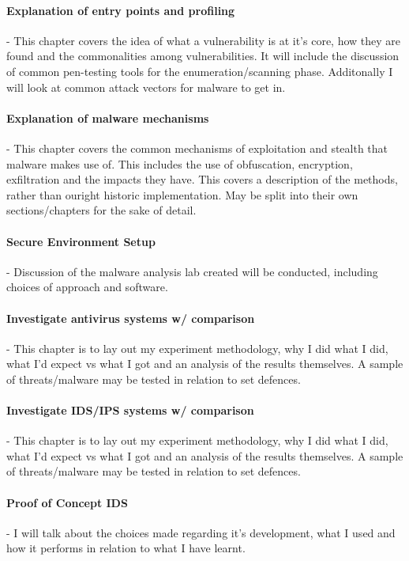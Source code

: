 \paragraph{Explanation of entry points and profiling} - This chapter covers the idea of what a vulnerability is at it's core, how they are found
and the commonalities among vulnerabilities. It will include the discussion of common pen-testing tools for the enumeration/scanning phase.
Additonally I will look at common attack vectors for malware to get in.

\paragraph{Explanation of malware mechanisms} - This chapter covers the common mechanisms of exploitation and stealth that malware makes use of. 
This includes the use of obfuscation, encryption, exfiltration and the impacts they have. This covers a description of the methods, rather than ouright historic implementation.
May be split into their own sections/chapters for the sake of detail.

\paragraph{Secure Environment Setup} - Discussion of the malware analysis lab created will be conducted, including choices of approach and software.

\paragraph{Investigate antivirus systems w/ comparison} - This chapter is to lay out my experiment methodology, why I did what I did, what I'd expect vs what I got and an analysis of the results themselves.  A sample of threats/malware may be tested in relation to set defences.

\paragraph{Investigate IDS/IPS systems w/ comparison} - This chapter is to lay out my experiment methodology, why I did what I did, what I'd expect vs what I got and an analysis of the results themselves. A sample of threats/malware may be tested in relation to set defences.

\paragraph{Proof of Concept IDS} - I will talk about the choices made regarding it's development, what I used and how it performs in relation to what I have learnt.

